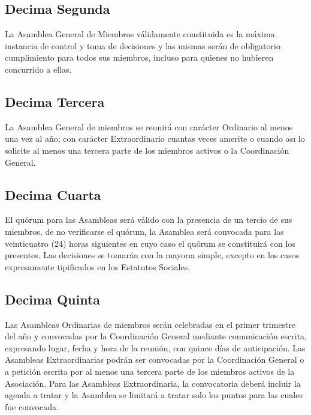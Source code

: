     \subsection{Decima Segunda}

      La Asamblea General de Miembros v\'alidamente constituida es la m\'axima
      instancia de control y toma de decisiones y las mismas ser\'an de
      obligatorio cumplimiento para todos sus miembros, incluso para quienes no
      hubieren concurrido a ellas.

    \subsection{Decima Tercera}
        
      La Asamblea General de miembros se reunir\'a con car\'acter Ordinario al
      menos una vez al a\~no; con car\'acter Extraordinario cuantas veces
      amerite o cuando as\i{} lo solicite al menos una tercera parte de los
      miembros activos o la Coordinaci\'on General.

    \subsection{Decima Cuarta}

      El qu\'orum para las Asambleas será v\'alido con la presencia de un tercio
      de sus miembros, de no verificarse el qu\'orum, la Asamblea ser\'a
      convocada para las veinticuatro (24) horas siguientes en cuyo caso el
      qu\'orum se constituir\'a con los presentes. Las decisiones se tomar\'an
      con la mayor\i{}a simple, excepto en los casos expresamente tipificados en
      los Estatutos Sociales.

    \subsection{Decima Quinta}

      Las Asambleas Ordinarias de miembros ser\'an celebradas en el primer
      trimestre del a\~no y convocadas por la Coordinaci\'on General mediante
      comunicaci\'on escrita, expresando lugar, fecha y hora de la reuni\'on,
      con quince d\'i{}as  de anticipaci\'on. Las Asambleas Extraordinarias
      podr\'an ser convocadas por la Coordinaci\'on General o a petici\'on
      escrita por al menos una tercera parte de los miembros activos de la
      Asociaci\'on. Para las Asambleas Extraordinaria, la convocatoria deber\'a
      incluir la agenda a tratar y la Asamblea se limitar\'a a tratar solo los
      puntos para las cuales fue convocada.

